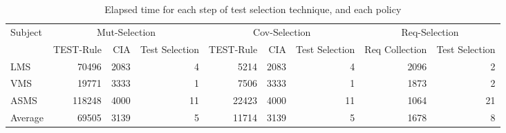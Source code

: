 
\begin{table}[htbp]
  \centering
  \caption{Elapsed time for each step of test selection technique, and each policy}
  	\vspace{-8pt}   
    \begin{tabular}{|l|r|r|r||r|r|r||r|r|}

			\hline
       \multirow{2}{*}{Subject}   & \multicolumn{3}{|c||}{Mut-Selection} & \multicolumn{3}{|c||}{Cov-Selection} & \multicolumn{2}{|c|}{Req-Selection} \\\cline{2-9}

          & TEST-Rule & CIA & Test Selection & TEST-Rule & CIA& Test Selection & Req Collection & Test Selection \\\hline\hline

		LMS   & 70496 & 2083  & 4     & 5214  & 2083  & 4     & 2096  & 2 \\\hline
    VMS   & 19771 & 3333  & 1     & 7506  & 3333  & 1     & 1873  & 2 \\\hline
    ASMS  & 118248 & 4000  & 11    & 22423 & 4000  & 11    & 1064  & 21 \\\hline\hline
    Average & 69505 & 3139  & 5     & 11714 & 3139  & 5     & 1678  & 8 \\\hline

    
    \end{tabular}%
  \label{tab:performance-results}%
\end{table}%

